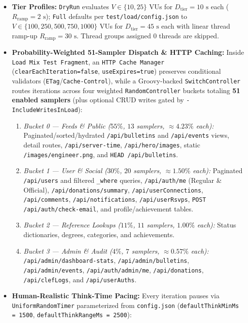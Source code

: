 \documentclass[11pt,letterpaper]{article}
\begin{document}
\begin{itemize}
  \item \textbf{Tier Profiles:} \texttt{DryRun} evaluates $V \in \{10, 25\}$ VUs for $D_{\text{tier}} = 10\text{ s}$ each ($R_{\text{ramp}} = 2\text{ s}$); \texttt{Full} defaults per \texttt{test/load/config.json} to $V \in \{100, 250, 500, 750, 1000\}$ VUs for $D_{\text{tier}} = 45\text{ s}$ each with linear thread ramp-up $R_{\text{ramp}} = 30\text{ s}$. Thread groups assigned $0$ threads are skipped.
  \item \textbf{Probability-Weighted 51-Sampler Dispatch \& HTTP Caching:} Inside \texttt{Load Mix Test Fragment}, an \texttt{HTTP Cache Manager} (\texttt{clearEachIteration=false}, \texttt{useExpires=true}) preserves conditional validators (\texttt{ETag}/\texttt{Cache-Control}), while a Groovy-backed \texttt{SwitchController} routes iterations across four weighted \texttt{RandomController} buckets totaling \textbf{51 enabled samplers} (plus optional CRUD writes gated by \texttt{-IncludeWritesInLoad}):
  \begin{enumerate}
    \item \emph{Bucket 0 — Feeds \& Public ($55\%$, $13$ samplers, $\approx 4.23\%$ each):} Paginated/sorted/hydrated \texttt{/api/bulletins} and \texttt{/api/events} views, detail routes, \texttt{/api/server-time}, \texttt{/api/hero/images}, static \texttt{/images/engineer.png}, and \texttt{HEAD /api/bulletins}.
    \item \emph{Bucket 1 — User \& Social ($30\%$, $20$ samplers, $\approx 1.50\%$ each):} Paginated \texttt{/api/users} and filtered \texttt{\_where} queries, \texttt{/api/auth/me} (Regular \& Official), \texttt{/api/donations/summary}, \texttt{/api/userConnections}, \texttt{/api/comments}, \texttt{/api/notifications}, \texttt{/api/userRsvps}, \texttt{POST /api/auth/check-email}, and profile/achievement tables.
    \item \emph{Bucket 2 — Reference Lookups ($11\%$, $11$ samplers, $1.00\%$ each):} Status dictionaries, degrees, categories, and achievements.
    \item \emph{Bucket 3 — Admin \& Audit ($4\%$, $7$ samplers, $\approx 0.57\%$ each):} \texttt{/api/admin/dashboard-stats}, \texttt{/api/admin/bulletins}, \texttt{/api/admin/events}, \texttt{/api/auth/admin/me}, \texttt{/api/donations}, \texttt{/api/clefLogs}, and \texttt{/api/userAuths}.
  \end{enumerate}
  \item \textbf{Human-Realistic Think-Time Pacing:} Every iteration pauses via \texttt{UniformRandomTimer} parameterized from \texttt{config.json} (\texttt{defaultThinkMinMs = 1500}, \texttt{defaultThinkRangeMs = 2500}):

\end{itemize}
\end{document}
